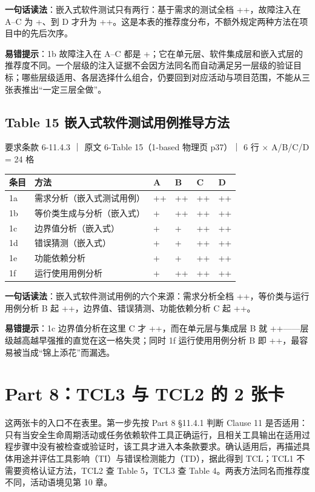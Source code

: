 \textbf{一句话读法}：嵌入式软件测试只有两行：基于需求的测试全档 ++，故障注入在 A–C 为 +、到 D 才升为 ++。这是本表的推荐度分布，不额外规定两种方法在项目中的先后次序。

\textbf{易错提示}：1b 故障注入在 A–C 都是 +；它在单元层、软件集成层和嵌入式层的推荐度不同。一个层级的注入证据不会因方法同名而自动满足另一层级的验证目标；哪些层级适用、各层选择什么组合，仍要回到对应活动与项目范围，不能从三张表推出“一定三层全做”。

\subsection{Table 15 嵌入式软件测试用例推导方法}

要求条款 6-11.4.3 ｜ 原文 6-Table 15（1-based 物理页 p37）｜ 6 行 \(\times\) A/B/C/D = 24 格

\begin{center}
\begingroup\small
\setlength{\tabcolsep}{4pt}
\begin{tabularx}{\linewidth}{@{}XXXXXX@{}}
\toprule
条目 & 方法 & A & B & C & D \\
\midrule
1a & 需求分析（嵌入式测试用例） & ++ & ++ & ++ & ++ \\
1b & 等价类生成与分析（嵌入式） & + & ++ & ++ & ++ \\
1c & 边界值分析（嵌入式） & + & + & ++ & ++ \\
1d & 错误猜测（嵌入式） & + & + & ++ & ++ \\
1e & 功能依赖分析 & + & + & ++ & ++ \\
1f & 运行使用用例分析 & + & ++ & ++ & ++ \\
\bottomrule
\end{tabularx}
\endgroup
\end{center}

\textbf{一句话读法}：嵌入式软件测试用例的六个来源：需求分析全档 ++，等价类与运行用例分析 B 起 ++，边界值、错误猜测、功能依赖分析 C 起 ++。

\textbf{易错提示}：1c 边界值分析在这里 C 才 ++，而在单元层与集成层 B 就 ++——层级越高越早强推的直觉在这一格失灵；同时 1f 运行使用用例分析 B 即 ++，最容易被当成“锦上添花”而漏选。

\section{Part 8：TCL3 与 TCL2 的 2 张卡}

这两张卡的入口不在表里。第一步先按 Part 8 §11.4.1 判断 Clause 11 是否适用：只有当安全生命周期活动或任务依赖软件工具正确运行，且相关工具输出在适用过程步骤中没有被检查或验证时，该工具才进入本条款要求。确认适用后，再描述具体用途并评估工具影响（TI）与错误检测能力（TD），据此得到 TCL；TCL1 不需要资格认证方法，TCL2 查 Table 5，TCL3 查 Table 4。两表方法同名而推荐度不同，活动语境见第 10 章。


